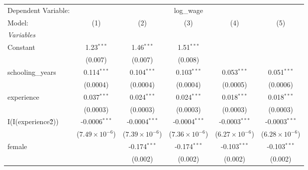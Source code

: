 
\begingroup
\centering
\begin{tabular}{lccccc}
   \tabularnewline \midrule \midrule
   Dependent Variable: & \multicolumn{5}{c}{log\_wage}\\
   Model:                                       & (1)                     & (2)                     & (3)                     & (4)                     & (5)\\  
   \midrule
   \emph{Variables}\\
   Constant                                     & 1.23$^{***}$            & 1.46$^{***}$            & 1.51$^{***}$            &                         &   \\   
                                                & (0.007)                 & (0.007)                 & (0.008)                 &                         &   \\   
   schooling\_years                             & 0.114$^{***}$           & 0.104$^{***}$           & 0.103$^{***}$           & 0.053$^{***}$           & 0.051$^{***}$\\   
                                                & (0.0004)                & (0.0004)                & (0.0004)                & (0.0005)                & (0.0006)\\   
   experience                                   & 0.037$^{***}$           & 0.024$^{***}$           & 0.024$^{***}$           & 0.018$^{***}$           & 0.018$^{***}$\\   
                                                & (0.0003)                & (0.0003)                & (0.0003)                & (0.0003)                & (0.0003)\\   
   I(I(experience\^2))                          & -0.0006$^{***}$         & -0.0004$^{***}$         & -0.0004$^{***}$         & -0.0003$^{***}$         & -0.0003$^{***}$\\   
                                                & ($7.49\times 10^{-6}$)  & ($7.39\times 10^{-6}$)  & ($7.36\times 10^{-6}$)  & ($6.27\times 10^{-6}$)  & ($6.28\times 10^{-6}$)\\    
   female                                       &                         & -0.174$^{***}$          & -0.174$^{***}$          & -0.103$^{***}$          & -0.103$^{***}$\\   
                                                &                         & (0.002)                 & (0.002)                 & (0.002)                 & (0.002)\\   

\end{tabular}

